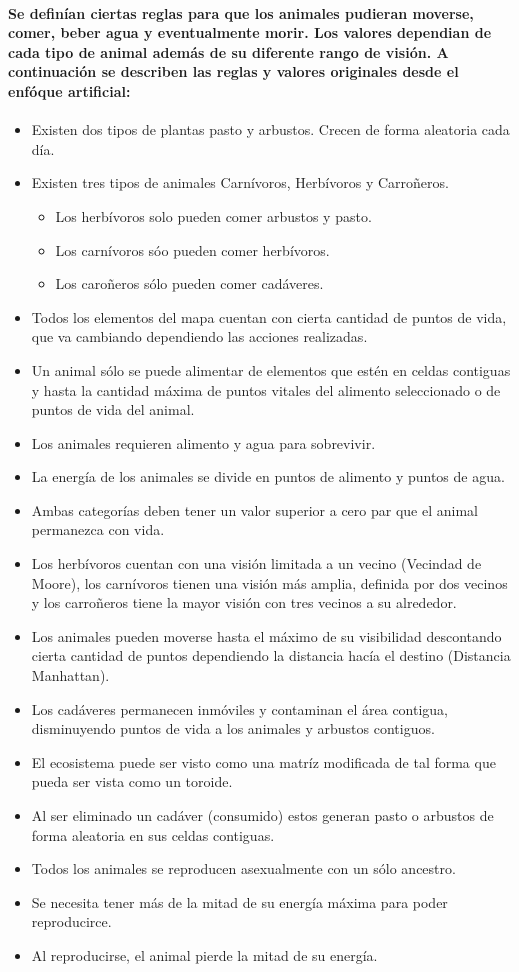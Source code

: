   \paragraph{Se definían ciertas reglas para que los animales pudieran moverse, comer, beber agua y eventualmente morir. Los valores dependian de cada tipo de animal además de su diferente rango de visión. A continuación se describen las reglas y valores originales desde el enfóque artificial:}
  \begin{itemize}
  \item{Existen dos tipos de plantas\: pasto y arbustos. Crecen de forma aleatoria cada día.}
  \item{Existen tres tipos de animales\: Carnívoros, Herbívoros y Carroñeros.}
    \begin{itemize}
      \item{Los herbívoros solo pueden comer arbustos y pasto.}
      \item{Los carnívoros sóo pueden comer herbívoros.}
      \item{Los caroñeros sólo pueden comer cadáveres.}
    \end{itemize}
  \item{Todos los elementos del mapa cuentan con cierta cantidad de puntos de vida, que va cambiando dependiendo las acciones realizadas.}
  \item{Un animal sólo se puede alimentar de elementos que estén en celdas contiguas y hasta la cantidad máxima de puntos vitales del alimento seleccionado o de puntos de vida del animal.}
  \item{Los animales requieren alimento y agua para sobrevivir.}
  \item{La energía de los animales se divide en puntos de alimento y puntos de agua.}
  \item{Ambas categorías deben tener un valor superior a cero par que el animal permanezca con vida.}
  \item{Los herbívoros cuentan con una visión limitada a un vecino (Vecindad de Moore), los carnívoros tienen una visión más amplia, definida por dos vecinos y los carroñeros tiene la mayor visión con tres vecinos a su alrededor.}
  \item{Los animales pueden moverse hasta el máximo de su visibilidad descontando cierta cantidad de puntos dependiendo la distancia hacía el destino (Distancia Manhattan).}
  \item{Los cadáveres permanecen inmóviles y contaminan el área contigua, disminuyendo puntos de vida a los animales y arbustos contiguos.}
  \item{El ecosistema puede ser visto como una matríz modificada de tal forma que pueda ser vista como un toroide.}
  \item{Al ser eliminado un cadáver (consumido) estos generan pasto o arbustos de forma aleatoria en sus celdas contiguas.}
  \item{Todos los animales se reproducen asexualmente con un sólo ancestro.}
  \item{Se necesita tener más de la mitad de su energía máxima para poder reproducirce.}
  \item{Al reproducirse, el animal pierde la mitad de su energía.}
  \end{itemize}
